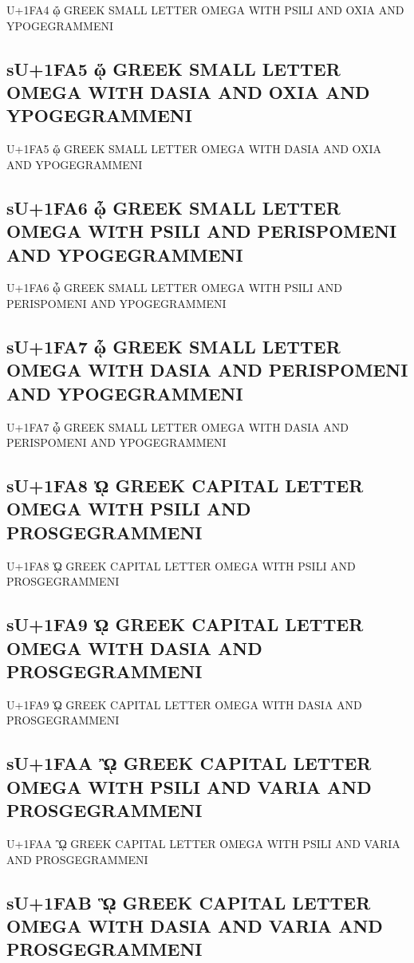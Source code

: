 U+1FA4 ᾤ GREEK SMALL LETTER OMEGA WITH PSILI AND OXIA AND YPOGEGRAMMENI

\subsection{sU+1FA5 ᾥ GREEK SMALL LETTER OMEGA WITH DASIA AND OXIA AND YPOGEGRAMMENI}

U+1FA5 ᾥ GREEK SMALL LETTER OMEGA WITH DASIA AND OXIA AND YPOGEGRAMMENI

\subsection{sU+1FA6 ᾦ GREEK SMALL LETTER OMEGA WITH PSILI AND PERISPOMENI AND YPOGEGRAMMENI}

U+1FA6 ᾦ GREEK SMALL LETTER OMEGA WITH PSILI AND PERISPOMENI AND YPOGEGRAMMENI

\subsection{sU+1FA7 ᾧ GREEK SMALL LETTER OMEGA WITH DASIA AND PERISPOMENI AND YPOGEGRAMMENI}

U+1FA7 ᾧ GREEK SMALL LETTER OMEGA WITH DASIA AND PERISPOMENI AND YPOGEGRAMMENI

\subsection{sU+1FA8 ᾨ GREEK CAPITAL LETTER OMEGA WITH PSILI AND PROSGEGRAMMENI}

U+1FA8 ᾨ GREEK CAPITAL LETTER OMEGA WITH PSILI AND PROSGEGRAMMENI

\subsection{sU+1FA9 ᾩ GREEK CAPITAL LETTER OMEGA WITH DASIA AND PROSGEGRAMMENI}

U+1FA9 ᾩ GREEK CAPITAL LETTER OMEGA WITH DASIA AND PROSGEGRAMMENI

\subsection{sU+1FAA ᾪ GREEK CAPITAL LETTER OMEGA WITH PSILI AND VARIA AND PROSGEGRAMMENI}

U+1FAA ᾪ GREEK CAPITAL LETTER OMEGA WITH PSILI AND VARIA AND PROSGEGRAMMENI

\subsection{sU+1FAB ᾫ GREEK CAPITAL LETTER OMEGA WITH DASIA AND VARIA AND PROSGEGRAMMENI}

